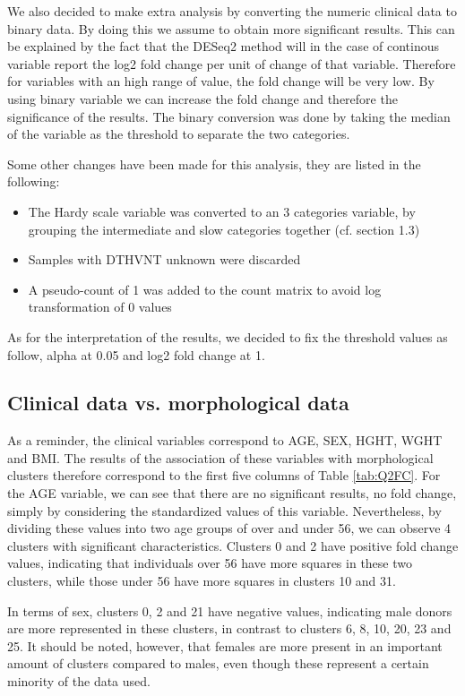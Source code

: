 \documentclass[a4paper, 11pt]{article}
\begin{document}
\begin{multicols}{2}
We also decided to make extra analysis by converting the numeric clinical data to binary data. By doing this we assume to obtain more significant results. 
This can be explained by the fact that the DESeq2 method will in the case of continous variable report the log2 fold change per unit of change of that variable.
Therefore for variables with an high range of value, the fold change will be very low. By using binary variable we can increase the fold change and therefore the significance of the results.
The binary conversion was done by taking the median of the variable as the threshold to separate the two categories.

Some other changes have been made for this analysis, they are listed in the following:
\begin{itemize}
	\item  The Hardy scale variable was converted to an 3 categories variable, by grouping the intermediate and slow categories together (cf. section 1.3)
	\item  Samples with DTHVNT unknown were discarded
	\item  A pseudo-count of 1 was added to the count matrix to avoid log transformation of 0 values
\end{itemize}
As for the interpretation of the results, we decided to fix the threshold values as follow, alpha at 0.05 and log2 fold change at 1.

\subsection{Clinical data vs. morphological data}
As a reminder, the clinical variables correspond to AGE, SEX, HGHT, WGHT and BMI. The results of the association of these variables with morphological clusters therefore correspond to the first five columns of Table \ref{tab:Q2FC}.
For the AGE variable, we can see that there are no significant results, no fold change, simply by considering the standardized values of this variable. Nevertheless, by dividing these values into two age groups of over and under 56, we can observe 4 clusters with significant characteristics. Clusters 0 and 2 have positive fold change values, indicating that individuals over 56 have more squares in these two clusters, while those under 56 have more squares in clusters 10 and 31.

In terms of sex, clusters 0, 2 and 21 have negative values, indicating male donors are more represented in these clusters, in contrast to clusters 6, 8, 10, 20, 23 and 25. It should be noted, however, that females are more present in an important amount of clusters compared to males, even though these represent a certain minority of the data used. 


\end{multicols}
\end{document}
